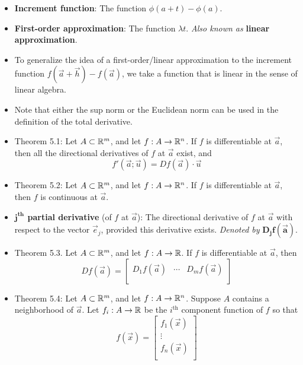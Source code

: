 \documentclass[../notes.tex]{subfiles}
\begin{document}
\begin{itemize}
    \item \textbf{Increment function}: The function $\phi(a+t)-\phi(a)$.
    \item \textbf{First-order approximation}: The function $\lambda t$. \emph{Also known as} \textbf{linear approximation}.
    \item To generalize the idea of a first-order/linear approximation to the increment function $f(\vec{a}+\vec{h})-f(\vec{a})$, we take a function that is linear in the sense of linear algebra.
    \item Note that either the sup norm or the Euclidean norm can be used in the definition of the total derivative.
    \item Theorem 5.1: Let $A\subset\mathbb{R}^m$, and let $f:A\to\mathbb{R}^n$. If $f$ is differentiable at $\vec{a}$, then all the directional derivatives of $f$ at $\vec{a}$ exist, and
    \begin{equation*}
        f'(\vec{a};\vec{u}) = Df(\vec{a})\cdot\vec{u}
    \end{equation*}
    \item Theorem 5.2: Let $A\subset\mathbb{R}^m$, and let $f:A\to\mathbb{R}^n$. If $f$ is differentiable at $\vec{a}$, then $f$ is continuous at $\vec{a}$.
    \item \textbf{$\bm{j^\textbf{th}}$ partial derivative} (of $f$ at $\vec{a}$): The directional derivative of $f$ at $\vec{a}$ with respect to the vector $\vec{e}_j$, provided this derivative exists. \emph{Denoted by} $\bm{D_jf(\vec{a})}$.
    \item Theorem 5.3. Let $A\subset\mathbb{R}^m$, and let $f:A\to\mathbb{R}$. If $f$ is differentiable at $\vec{a}$, then
    \begin{equation*}
        Df(\vec{a}) =
        \begin{bmatrix}
            D_1f(\vec{a}) & \cdots & D_mf(\vec{a})\\
        \end{bmatrix}
    \end{equation*}
    \item Theorem 5.4: Let $A\subset\mathbb{R}^m$, and let $f:A\to\mathbb{R}^n$. Suppose $A$ contains a neighborhood of $\vec{a}$. Let $f_i:A\to\mathbb{R}$ be the $i^\text{th}$ component function of $f$ so that
    \begin{equation*}
        f(\vec{x}) =
        \begin{bmatrix}
            f_1(\vec{x})\\
            \vdots\\
            f_n(\vec{x})\\

\end{bmatrix}
\end{equation*}
\end{itemize}
\end{document}

